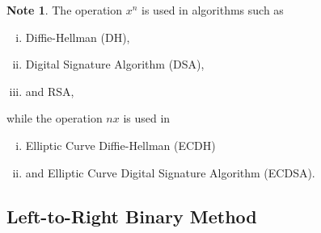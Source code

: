 \documentclass[12pt,openany]{book}
\theoremstyle{definition}
\newtheorem*{note}{Note}
\begin{document}
	\begin{note}
		The operation $x^n$ is used in algorithms such as \begin{enumerate}[(i)]
			\item Diffie-Hellman (DH),
			\item Digital Signature Algorithm (DSA),
			\item and RSA,
		\end{enumerate} while the operation $nx$ is used in \begin{enumerate}[(i)]
			\item Elliptic Curve Diffie-Hellman (ECDH)
			\item and Elliptic Curve Digital Signature Algorithm (ECDSA).
		\end{enumerate}
	\end{note}
	
	\subsection{Left-to-Right Binary Method}
	
\end{document}
